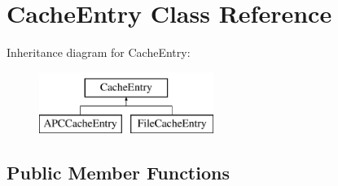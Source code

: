 \hypertarget{classCacheEntry}{
\section{CacheEntry Class Reference}
\label{classCacheEntry}
}
Inheritance diagram for CacheEntry:\begin{figure}[H]
\begin{center}
\leavevmode
\includegraphics[height=2.000000cm]{classCacheEntry}
\end{center}
\end{figure}
\subsection*{Public Member Functions}
